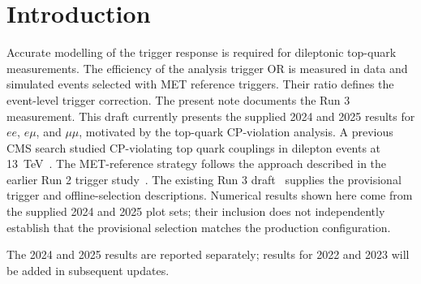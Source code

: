 \section{Introduction}\label{sec:intro}
Accurate modelling of the trigger response is required for dileptonic top-quark measurements. The efficiency of the analysis trigger OR is measured in data and simulated events selected with MET reference triggers. Their ratio defines the event-level trigger correction. The present note documents the Run 3 measurement. This draft currently presents the supplied 2024 and 2025 results for $ee$, $e\mu$, and $\mu\mu$, motivated by the top-quark CP-violation analysis. A previous CMS search studied CP-violating top quark couplings in dilepton events at 13~TeV~\cite{TOP18007}.
The MET-reference strategy follows the approach described in the earlier Run 2 trigger study~\cite{run2}. The existing Run 3 draft~\cite{earlier} supplies the provisional trigger and offline-selection descriptions. Numerical results shown here come from the supplied 2024 and 2025 plot sets; their inclusion does not independently establish that the provisional selection matches the production configuration.

The 2024 and 2025 results are reported separately; results for 2022 and 2023 will be added in subsequent updates.
